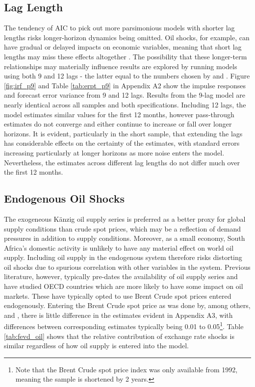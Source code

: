 \documentclass[12pt]{article}
\begin{document}
\subsection{Lag Length}

  The tendency of AIC to pick out more parsimonious models with shorter lag lengths risks longer-horizon dynamics being omitted. Oil shocks, for example, can have gradual or delayed impacts on economic variables, meaning that short lag lengths may miss these effects altogether \parencite{EDELSTEIN2009766, hamilton-herrera}. The possibility that these longer-term relationships may materially influence results are explored by running models using both 9 and 12 lags - the latter equal to the numbers chosen by \textcite{mccarthy1999} and \textcite{hahn2003}. Figure \ref{fig:irf_p9} and Table \ref{tab:erpt_p9} in Appendix A2 show the impulse responses and forecast error variance from 9 and 12 lags. Results from the 9-lag model are nearly identical across all samples and both specifications. Including 12 lags, the model estimates similar values for the first 12 months, however pass-through estimates do not converge and either continue to increase or fall over longer horizons. It is evident, particularly in the short sample, that extending the lags has considerable effects on the certainty of the estimates, with standard errors increasing particularly at longer horizons as more noise enters the model. Nevertheless, the estimates across different lag lengths do not differ much over the first 12 months. 

\subsection{Endogenous Oil Shocks}

The exogeneous K\"anzig oil supply series is preferred as a better proxy for global supply conditions than crude spot prices, which may be a reflection of demand pressures in addition to supply conditions. Moreover, as a small economy, South Africa's domestic activity is unlikely to have any material effect on world oil supply. Including oil supply in the endogenous system therefore risks distorting oil shocks due to spurious correlation with other variables in the system. Previous literature, however, typically pre-dates the availability of oil supply series and have studied OECD countries which are more likely to have some impact on oil markets. These have typically opted to use Brent Crude spot prices entered endogenously. Entering the \citeauthor{imf_pcps} Brent Crude spot price as was done by, among others, \textcite{mccarthy1999} and \textcite{AnWang2011}, there is little difference in the estimates evident in Appendix A3, with differences between corresponding estimates typically being 0.01 to 0.05\footnote{Note that the Brent Crude spot price index was only available from 1992, meaning the sample is shortened by 2 years.}. Table \ref{tab:fevd_oil} shows that the relative contribution of exchange rate shocks is similar regardless of how oil supply is entered into the model. 
\end{document}

